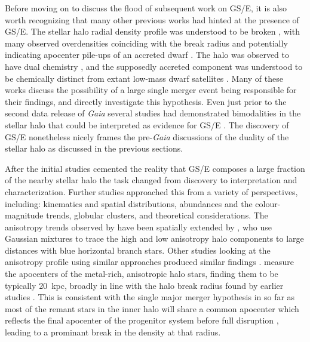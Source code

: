 Before moving on to discuss the flood of subsequent work on GS/E, it is also worth recognizing that many other previous works had hinted at the presence of GS/E. The stellar halo radial density profile was understood to be broken \parencite{deason11,sesar11}, with many observed overdensities coinciding with the break radius and potentially indicating apocenter pile-ups of an accreted dwarf \parencite{li16}. The halo was observed to have dual chemistry \parencite{carollo07,nissen10}, and the supposedly accreted component was understood to be chemically distinct from extant low-mass dwarf satellites \parencite{venn04}. Many of these works discuss the possibility of a large single merger event being responsible for their findings, and \textcite{deason13} directly investigate this hypothesis. Even just prior to the second data release of \textit{Gaia} several studies had demonstrated bimodalities in the stellar halo that could be interpreted as evidence for GS/E \parencite{bonaca17,deason17,hayes18}. The discovery of GS/E nonetheless nicely frames the pre-\textit{Gaia} discussions of the duality of the stellar halo as discussed in the previous sections.

After the initial studies cemented the reality that GS/E composes a large fraction of the nearby stellar halo the task changed from discovery to interpretation and characterization. Further studies approached this from a variety of perspectives, including: kinematics and spatial distributions, abundances and the colour-magnitude trends, globular clusters, and theoretical considerations. The anisotropy trends observed by \textcite{belokurov18} have been spatially extended by \textcite{lancaster19}, who use Gaussian mixtures to trace the high and low anisotropy halo components to large distances with blue horizontal branch stars. Other studies looking at the anisotropy profile using similar approaches produced similar findings \parencite{necib19,bird19}. \textcite{deason18} measure the apocenters of the metal-rich, anisotropic halo stars, finding them to be typically 20~kpc, broadly in line with the halo break radius found by earlier studies \parencite[e.g.][]{deason11,sesar11,xue15}. This is consistent with the single major merger hypothesis in so far as most of the remant stars in the inner halo will share a common apocenter which reflects the final apocenter of the progenitor system before full disruption \parencite[indeed, this was the driver for the hypothesis of][]{deason13}, leading to a prominant break in the density at that radius. 

